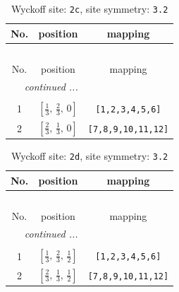 \documentclass[fleqn,8pt]{jsarticle}
\begin{document}
\begin{longtable}{ccc}
\caption{Wyckoff site: {\tt 2c}, site symmetry: {\tt 3.2}}
 \\
 \hline \hline
No. & position & mapping \\ \hline \endfirsthead

\multicolumn{2}{l}{\tablename\ \thetable{}} \\
 \hline \hline
No. & position & mapping \\ \hline \endhead

 \hline \hline
\multicolumn{2}{r}{\footnotesize\it continued ...} \\ \endfoot

 \hline \hline
\multicolumn{2}{r}{} \\ \endlastfoot

1 & $\left[ \frac{1}{3},\, \frac{2}{3},\, 0 \right]$ & {\tt [1,2,3,4,5,6]} \\ \hline
2 & $\left[ \frac{2}{3},\, \frac{1}{3},\, 0 \right]$ & {\tt [7,8,9,10,11,12]} \\
\end{longtable}
\renewcommand{\arraystretch}{1.2}
\begin{longtable}{ccc}
\caption{Wyckoff site: {\tt 2d}, site symmetry: {\tt 3.2}}
 \\
 \hline \hline
No. & position & mapping \\ \hline \endfirsthead

\multicolumn{2}{l}{\tablename\ \thetable{}} \\
 \hline \hline
No. & position & mapping \\ \hline \endhead

 \hline \hline
\multicolumn{2}{r}{\footnotesize\it continued ...} \\ \endfoot

 \hline \hline
\multicolumn{2}{r}{} \\ \endlastfoot

1 & $\left[ \frac{1}{3},\, \frac{2}{3},\, \frac{1}{2} \right]$ & {\tt [1,2,3,4,5,6]} \\ \hline
2 & $\left[ \frac{2}{3},\, \frac{1}{3},\, \frac{1}{2} \right]$ & {\tt [7,8,9,10,11,12]} \\
\end{longtable}
\renewcommand{\arraystretch}{1.2}
\end{document}
